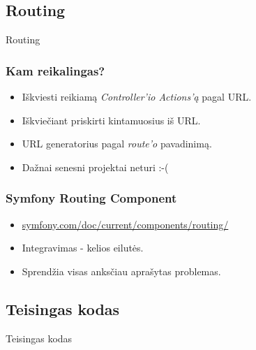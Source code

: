 \documentclass[12pt,a4paper]{beamer}
\begin{document}
\subsection{Routing}
\begin{frame}[fragile]

    {\Huge Routing}
\end{frame}
\begin{frame}
    \frametitle{Kam reikalingas?}

    \begin{itemize}
        \item Iškviesti reikiamą \textit{Controller'io Actions'ą} pagal URL.
        \item Iškviečiant priskirti kintamuosius iš URL.
        \item URL generatorius pagal \textit{route'o} pavadinimą.
        \item Dažnai senesni projektai neturi :-(
    \end{itemize}
\end{frame}
\begin{frame}
    \frametitle{Symfony Routing Component}

    \begin{itemize}
        \item \url{symfony.com/doc/current/components/routing/}
        \item Integravimas - kelios eilutės.
        \item Sprendžia visas anksčiau aprašytas problemas.
    \end{itemize}
\end{frame}
\subsection{Teisingas kodas}
\begin{frame}[fragile]

    {\Huge Teisingas kodas}
\end{frame}
\end{document}
